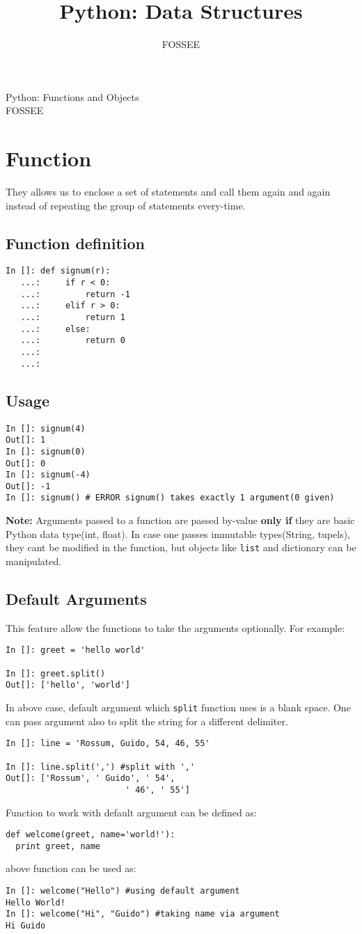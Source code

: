 \documentclass[12pt]{article}
\title{Python: Data Structures}
\author{FOSSEE}
\newcommand{\typ}[1]{\lstinline{#1}}
\begin{document}
\date{}
\vspace{-1in}
\begin{center}
\LARGE{Python: Functions and Objects}\\
\large{FOSSEE}
\end{center}
\section{Function}
They allows us to enclose a set of statements and call them again and again instead of repeating the group of statements every-time. 
\subsection{Function definition}
  \begin{lstlisting}
In []: def signum(r):
   ...:     if r < 0:
   ...:         return -1
   ...:     elif r > 0:
   ...:         return 1
   ...:     else:
   ...:         return 0
   ...:     
   ...:
  \end{lstlisting}
\subsection{Usage}
\begin{lstlisting}
In []: signum(4)
Out[]: 1
In []: signum(0)
Out[]: 0
In []: signum(-4)
Out[]: -1
In []: signum() # ERROR signum() takes exactly 1 argument(0 given)
\end{lstlisting}
\textbf{Note:} Arguments passed to a function are passed by-value \textbf{only if} they are basic Python data type(int, float). In case one passes immutable types(String, tupels), they cant be modified in the function, but objects like \typ{list} and dictionary can be manipulated.
\subsection{Default Arguments}
This feature allow the functions to take the arguments optionally. For example:
\begin{lstlisting}
In []: greet = 'hello world'

In []: greet.split()
Out[]: ['hello', 'world']
\end{lstlisting}
In above case, default argument which \typ{split} function uses is a blank space. One can pass argument also to split the string for a different delimiter.
\begin{lstlisting}
In []: line = 'Rossum, Guido, 54, 46, 55'

In []: line.split(',') #split with ','
Out[]: ['Rossum', ' Guido', ' 54',
                        ' 46', ' 55']
\end{lstlisting}
Function to work with default argument can be defined as:
\begin{lstlisting}
def welcome(greet, name='world!'):
  print greet, name
\end{lstlisting}
above function can be used as:
\begin{lstlisting}
In []: welcome("Hello") #using default argument
Hello World!
In []: welcome("Hi", "Guido") #taking name via argument
Hi Guido
\end{lstlisting}
\end{document}

